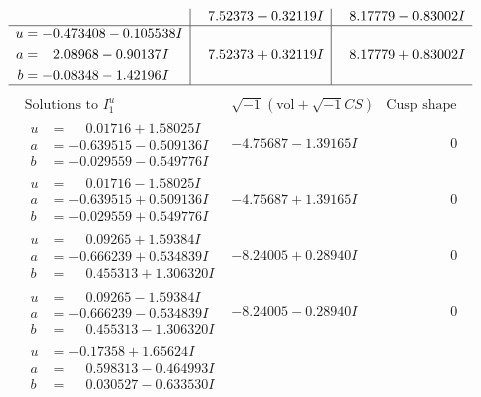 \documentclass[1p]{elsarticle_modified}
\theoremstyle{definition}
\newcommand{\I}{\sqrt{-1}}
\begin{document}
$$\begin{array}{c|c|c}
 & \phantom{-}7.52373 - 0.32119 I & \phantom{-}8.17779 - 0.83002 I \\ \hline\begin{aligned}
u &= -0.473408 - 0.105538 I \\
a &= \phantom{-}2.08968 - 0.90137 I \\
b &= -0.08348 - 1.42196 I\end{aligned}
 & \phantom{-}7.52373 + 0.32119 I & \phantom{-}8.17779 + 0.83002 I\\
 \hline 
 \end{array}$$\newpage$$\begin{array}{c|c|c}  
\text{Solutions to }I^u_{1}& \I (\text{vol} + \sqrt{-1}CS) & \text{Cusp shape}\\
 \hline 
\begin{aligned}
u &= \phantom{-}0.01716 + 1.58025 I \\
a &= -0.639515 - 0.509136 I \\
b &= -0.029559 - 0.549776 I\end{aligned}
 & -4.75687 - 1.39165 I & \phantom{-0.000000 } 0 \\ \hline\begin{aligned}
u &= \phantom{-}0.01716 - 1.58025 I \\
a &= -0.639515 + 0.509136 I \\
b &= -0.029559 + 0.549776 I\end{aligned}
 & -4.75687 + 1.39165 I & \phantom{-0.000000 } 0 \\ \hline\begin{aligned}
u &= \phantom{-}0.09265 + 1.59384 I \\
a &= -0.666239 + 0.534839 I \\
b &= \phantom{-}0.455313 + 1.306320 I\end{aligned}
 & -8.24005 + 0.28940 I & \phantom{-0.000000 } 0 \\ \hline\begin{aligned}
u &= \phantom{-}0.09265 - 1.59384 I \\
a &= -0.666239 - 0.534839 I \\
b &= \phantom{-}0.455313 - 1.306320 I\end{aligned}
 & -8.24005 - 0.28940 I & \phantom{-0.000000 } 0 \\ \hline\begin{aligned}
u &= -0.17358 + 1.65624 I \\
a &= \phantom{-}0.598313 - 0.464993 I \\
b &= \phantom{-}0.030527 - 0.633530 I\end{aligned}

\end{array}$$
\end{document}
